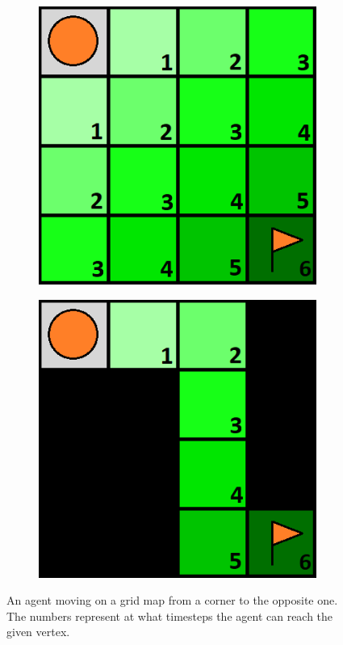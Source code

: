 \begin{figure}[ht]
\centering
\hspace{0.9cm}
\begin{subfigure}{0.27\columnwidth}
\centering
\includegraphics[width=\textwidth]{img/diagonal_agent.png}
\caption{}
\label{fig:diagonal}
\end{subfigure}
\hfill
\begin{subfigure}{0.27\columnwidth}
\centering
\includegraphics[width=\textwidth]{img/diagonal_single_path.png}
\caption{}
\label{fig:diagonal_path}
\end{subfigure}
\hspace{0.9cm}
\caption{An agent moving on a grid map from a corner to the opposite one. The numbers represent at what timesteps the agent can reach the given vertex.}
\label{fig:diagonal_example}
\end{figure}


